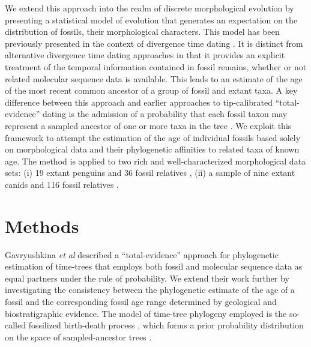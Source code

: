 \documentclass[11pt]{article}
\newcommand{\ncanidfossils}{{116}}
\begin{document}
We extend this approach into the realm of discrete morphological evolution by presenting a statistical model of evolution that generates an expectation on the distribution of fossils, their morphological characters. 
This model has been previously presented in the context of divergence time dating \cite{gavr2014,gavryushkina2015bayesian}. 
It is distinct from alternative divergence time dating approaches in that it provides an explicit treatment of the temporal information contained in fossil remains, whether or not related molecular sequence data is available. 
This leads to an estimate of the age of the most recent common ancestor of a group of fossil and extant taxa. A key difference between this approach and earlier approaches to tip-calibrated ``total-evidence'' dating \cite{Ronq2012} is the admission of a probability that each fossil taxon may represent a sampled ancestor of one or more taxa  in the tree \cite{gavr2014}.
We exploit this framework to attempt the estimation of the age of individual fossils based solely on morphological data and their phylogenetic affinities to related taxa of known age. 
The method is applied to two rich and well-characterized morphological data sets: (i) 
19 extant penguins and 36 fossil relatives \cite{ksepka2010,ksepka2012}, (ii) a sample of nine extant canids and \ncanidfossils{} fossil relatives \cite{Slater2015}.

\section*{Methods}

Gavryushkina {\it et al} \cite{gavryushkina2015bayesian} described a ``total-evidence'' approach \cite[implemented in BEAST2;][]{Beast2} for phylogenetic estimation of time-trees that employs both fossil and molecular sequence data as equal partners under the rule of probability. 
We extend their work further by investigating the consistency between the phylogenetic estimate of the age of a fossil and the corresponding fossil age range determined by geological and biostratigraphic evidence. 
The model of time-tree phylogeny employed is the so-called fossilized birth-death process \cite{Heath2014}, which forms a prior probability distribution on the space of sampled-ancestor trees \cite{Gavr2013}.
\end{document}
